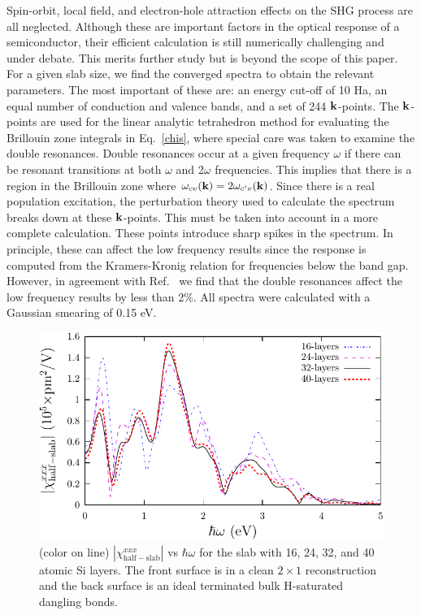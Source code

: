 \documentclass[floatfix,prb,aps,superscriptaddress,11pt,preprint,letterpaper]{revtex4}
\def\chon{red}
\begin{document}
{\color{\chon} Spin-orbit, local field, and electron-hole 
attraction\cite{leitsmannPRB05,trollePRB14} 
effects on the SHG process are all neglected.}
Although these are important factors in the optical response of a semiconductor,
{\color{\chon} their efficient calculation is still numerically challenging and 
under debate. This merits further study but is beyond the scope of this paper.}
For a given {\color{\chon} slab size, we find the} converged spectra 
{\color{\chon} to obtain the relevant parameters. The most important of 
these are: an energy cut-off of 10 Ha, an equal number of conduction and 
valence bands, and a set of 244 $\mathbf{k}$-points.} 
{\color{\chon} The $\mathbf{k}$-points are used} for the linear analytic 
tetrahedron method {\color{\chon} for evaluating the}
Brillouin zone integrals in Eq.~\eqref{chis}, 
where special care was taken to examine the double resonances.\cite{nastosPRB05}
{\color{\chon}
Double resonances occur at a given frequency $\omega$ if there can be 
resonant transitions at both $\omega$ and 2$\omega$ frequencies. This 
implies that there is a region in the Brillouin zone where 
$\omega_{cv}(\mathbf{k})=2 \omega_{c'v}(\mathbf{k})$. Since there is a real population 
excitation, the perturbation theory used to calculate the spectrum breaks 
down at these $\mathbf{k}$-points. This must be taken into account in a more 
complete calculation. These points introduce sharp spikes in the spectrum. 
In principle, these can affect the low frequency results since the response 
is computed from the Kramers-Kronig relation for frequencies below the band 
gap. However, in agreement with Ref.~ we find that 
the double resonances affect the low frequency results by less than 2\%. 
All spectra were calculated with a Gaussian smearing of 0.15 eV.}
\begin{figure}
\centering 
\includegraphics[scale=.8]{plots/fig1}
\caption{(color on line) 
$|\chi_{\mathrm{half-slab}}^{xxx}|$ vs $\hbar\omega$ 
{\color{\chon} for the slab} 
with 16, 24, 32, and 40 atomic Si layers. The front surface 
{\color{\chon} is in a clean $2\times 1$ reconstruction and the back 
surface is an ideal terminated bulk H-saturated dangling bonds.}
\label{fig1}} 
\end{figure}
\end{document}
